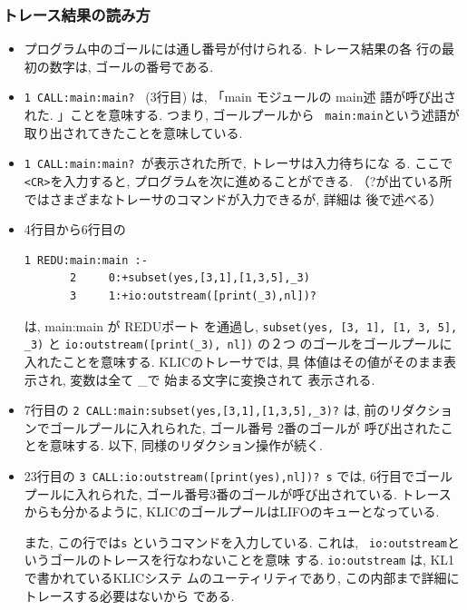 \documentclass[a4,titlepage]{jsreport}
\begin{document}
\subsubsection{トレース結果の読み方}

\begin{itemize}\parskip=0mm\baselineskip
\item プログラム中のゴールには通し番号が付けられる.  トレース結果の各
行の最初の数字は, ゴールの番号である.   
\item {\tt 1 CALL:main:main? } (3行目) は, 「main モジュールの main述
語が呼び出された.  」ことを意味する.  つまり, ゴールプールから {\tt
main:main}という述語が取り出されてきたことを意味している.   
\item {\tt 1 CALL:main:main? }が表示された所で, トレーサは入力待ちにな
る.  ここで{\tt <CR>}を入力すると, プログラムを次に進めることができる. 
（?が出ている所ではさまざまなトレーサのコマンドが入力できるが, 詳細は
後で述べる） 
\item 4行目から6行目の
\begin{Verbatim}[baselinestretch=0.8]
       1 REDU:main:main :-
       2     0:+subset(yes,[3,1],[1,3,5],_3)
       3     1:+io:outstream([print(_3),nl])?
\end{Verbatim}
は, main:main が REDUポート を通過し, {\tt subset(yes, [3, 1], [1, 3,
5], \_3)} と {\tt io:\linebreak[1]outstream([print(\_3), nl])} の２つ
のゴールをゴールプールに入れたことを意味する.  KLICのトレーサでは, 具
体値はその値がそのまま表示され, 変数は全て \_で 始まる文字に変換されて
表示される.

\item 7行目の {\tt 2 CALL:main:subset(yes,[3,1],[1,3,5],\_3)?} は, 
前のリダクションでゴールプールに入れられた, ゴール番号 2番のゴールが
呼び出されたことを意味する. 以下, 同様のリダクション操作が続く.

\item 23行目の {\tt 3 CALL:io:outstream([print(yes),nl])? s} では, 
6行目でゴールプールに入れられた, ゴール番号3番のゴールが呼び出されている.
トレースからも分かるように, KLICのゴールプールはLIFOのキューとなっている.

また, この行では{\tt s} というコマンドを入力している.  これは, {\tt
io:\linebreak[1]outstream}というゴールのトレースを行なわないことを意味
する.  {\tt io:\linebreak[1]outstream} は, KL1で書かれているKLICシステ
ムのユーティリティであり, この内部まで詳細にトレースする必要はないから
である.
\end{itemize}
\end{document}
